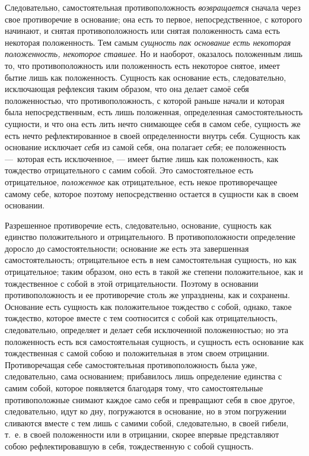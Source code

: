 Следовательно, самостоятельная противоположность
{\em возвращается} сначала через свое противоречие в
основание; она есть то первое, непосредственное, с которого начинают, и
снятая противоположность или снятая положенность сама есть некоторая
положенность. Тем самым {\em сущность пак основание
есть некоторая положенность, некоторое ставшее}. Но и наоборот, оказалось
положенным лишь то, что противоположность или положенность есть некоторое
снятое, имеет бытие лишь как положенность. Сущность как основание есть,
следовательно, исключающая рефлексия таким образом, что она делает самоё
себя положенностью, что противоположность, с которой раньше начали и
которая была непосредственным, есть лишь положенная, определенная
самостоятельность сущности, и что она есть лить нечто снимающее себя в
самом себе, сущность же есть нечто рефлектированное в своей определенности
внутрь себя. Сущность как основание исключает
{\em себя} из самой себя, она полагает
{\em себя}; ее положенность —~которая есть исключенное,
— имеет бытие лишь как положенность, как тождество отрицательного с самим
собой. Это самостоятельное есть отрицательное,
{\em положенное} как отрицательное, есть некое
противоречащее самому себе, которое поэтому непосредственно остается в
сущности как в своем основании.

Разрешенное противоречие есть, следовательно, основание, сущность как
единство положительного и отрицательного. В противоположности определение
доросло до самостоятельности; основание же есть эта завершенная
самостоятельность; отрицательное есть в нем самостоятельная сущность, но
как отрицательное; таким образом, оно есть в такой же степени
положительное, как и тождественное с собой в этой отрицательности. Поэтому
в основании противоположность и ее противоречие столь же упразднены, как и
сохранены. Основание есть сущность как положительное тождество с собой,
однако, такое тождество, которое вместе с тем соотносится с собой как
отрицательность, следовательно, определяет и делает себя исключенной
положенностью; но эта положенность есть вся самостоятельная сущность, и
сущность есть основание как тождественная с самой собою и положительная в
этом своем отрицании. Противоречащая себе самостоятельная противоположность
была уже, следовательно, сама основанием; прибавилось лишь определение
единства с самим собой, которое появляется благодаря тому, что
самостоятельные противоположные снимают каждое само себя и превращают себя
в свое другое, следовательно, идут ко дну, погружаются в основание, но в
этом погружении сливаются вместе с тем лишь с самими собой, следовательно,
в своей гибели, т.~е. в своей положенности или в отрицании, скорее впервые
представляют собою рефлектировавшую в себя, тождественную с собой сущность.

